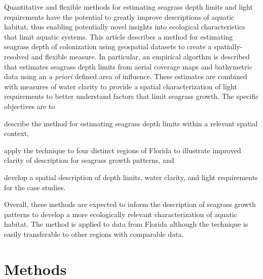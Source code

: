 \documentclass[letterpaper,12pt,oneside]{article}\usepackage[]{graphicx}\usepackage[]{color}
\begin{document}
Quantitative and flexible methods for estimating seagrass depth limits and light requirements have the potential to greatly improve descriptions of aquatic habitat, thus enabling potentially novel insights into ecological characteristics that limit aquatic systems.  This article describes a method for estimating seagrass depth of colonization using geospatial datasets to create a spatially-resolved and flexible measure.  In particular, an empirical algorthm is described that estimates seagrass depth limits from aerial coverage maps and bathymetric data using an \textit{a priori} defined area of influence. These estimates are combined with measures of water clarity to provide a spatial characterization of light requirements to better understand factors that limit seagrass growth.  The specific objectives are to\begin{inparaenum}[1\upshape)]
\item describe the method for estimating seagrass depth limits within a relevant spatial context, 
\item apply the technique to four distinct regions of Florida to illustrate improved clarity of description for seagrass growth patterns, and
\item develop a spatial description of depth limits, water clarity, and light requirements for the case studies.  
\end{inparaenum}
Overall, these methods are expected to inform the description of seagrass growth patterns to develop a more ecologically relevant characterization of aquatic habitat.  The method is applied to data from Florida although the technique is easily transferable to other regions with comparable data. 

\section{Methods}
\end{document}
